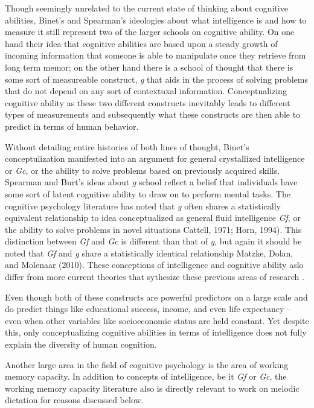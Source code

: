 \documentclass[]{book}
\theoremstyle{definition}
\theoremstyle{definition}
\theoremstyle{definition}
\theoremstyle{remark}
\begin{document}
Though seemingly unrelated to the current state of thinking about
cognitive abilities, Binet's and Spearman's ideologies about what
intelligence is and how to measure it still represent two of the larger
schools on cognitive ability. On one hand their idea that cognitive
abilities are based upon a steady growth of incoming information that
someone is able to manipulate once they retrieve from long term memor;
on the other hand there is a school of thought that there is some sort
of measureable construct, \emph{g} that aids in the process of solving
problems that do not depend on any sort of contextuxal information.
Conceptualizing cognitive ability as these two different constructs
inevitably leads to different types of measurements and subsequently
what these constructs are then able to predict in terms of human
behavior.

Without detailing entire histories of both lines of thought, Binet's
conceptulization manifested into an argument for general crystallized
intelligence or \emph{Gc}, or the ability to solve problems based on
previously acquired skills. Spearman and Burt's ideas about \emph{g}
school reflect a belief that individuals have some sort of latent
cognitive ability to draw on to perform mental tasks. The cognitive
psychology literature has noted that \emph{g} often shares a
statistically equivalent relationship to idea conceptualized as general
fluid intelligence \emph{Gf}, or the ability to solve problems in novel
situations Cattell, 1971; Horn, 1994). This distinction between
\emph{Gf} and \emph{Gc} is different than that of \emph{g}, but again it
should be noted that \emph{Gf} and \emph{g} share a statistically
identical relationship Matzke, Dolan, and Molenaar (2010). These
conceptions of intelligenec and cognitive ability aslo differ from more
current theories that sythesize these previous areas of research
\citep{kovacsProcessOverlapTheory2016}.

Even though both of these constructs are powerful predictors on a large
scale and do predict things like educational success, income, and even
life expectancy \citep{ritchieIntelligenceAllThat2015}-- even when other
variables like socioeconomic status are held constant. Yet despite this,
only conceptualizing cognitive abilities in terms of intelligence does
not fully explain the diversity of human cognition.

Another large area in the field of cognitive psychology is the area of
working memory capacity. In addition to concepts of intelligence, be it
\emph{Gf} or \emph{Gc}, the working memory capacity literature also is
directly relevant to work on melodic dictation for reasons discussed
below.
\end{document}

